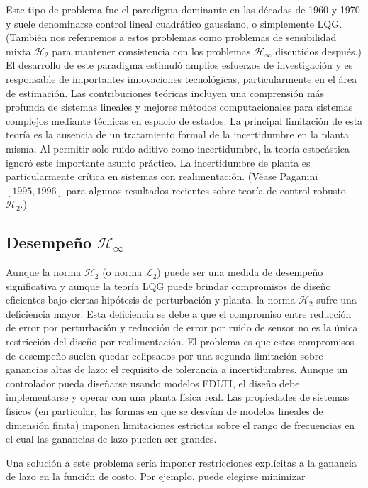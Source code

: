 Este tipo de problema fue el paradigma dominante en las décadas de 1960 y 1970 y suele denominarse control lineal cuadrático gaussiano, o simplemente LQG. (También nos referiremos a estos problemas como problemas de sensibilidad mixta $\mathcal{H}_{2}$ para mantener consistencia con los problemas $\mathcal{H}_{\infty}$ discutidos después.) El desarrollo de este paradigma estimuló amplios esfuerzos de investigación y es responsable de importantes innovaciones tecnológicas, particularmente en el área de estimación. Las contribuciones teóricas incluyen una comprensión más profunda de sistemas lineales y mejores métodos computacionales para sistemas complejos mediante técnicas en espacio de estados. La principal limitación de esta teoría es la ausencia de un tratamiento formal de la incertidumbre en la planta misma. Al permitir solo ruido aditivo como incertidumbre, la teoría estocástica ignoró este importante asunto práctico. La incertidumbre de planta es particularmente crítica en sistemas con realimentación. (Véase Paganini $[1995,1996]$ para algunos resultados recientes sobre teoría de control robusto $\mathcal{H}_{2}$.)

\subsection*{Desempeño $\mathcal{H}_{\infty}$}
Aunque la norma $\mathcal{H}_{2}$ (o norma $\mathcal{L}_{2}$) puede ser una medida de desempeño significativa y aunque la teoría LQG puede brindar compromisos de diseño eficientes bajo ciertas hipótesis de perturbación y planta, la norma $\mathcal{H}_{2}$ sufre una deficiencia mayor. Esta deficiencia se debe a que el compromiso entre reducción de error por perturbación y reducción de error por ruido de sensor no es la única restricción del diseño por realimentación. El problema es que estos compromisos de desempeño suelen quedar eclipsados por una segunda limitación sobre ganancias altas de lazo: el requisito de tolerancia a incertidumbres. Aunque un controlador pueda diseñarse usando modelos FDLTI, el diseño debe implementarse y operar con una planta física real. Las propiedades de sistemas físicos (en particular, las formas en que se desvían de modelos lineales de dimensión finita) imponen limitaciones estrictas sobre el rango de frecuencias en el cual las ganancias de lazo pueden ser grandes.

Una solución a este problema sería imponer restricciones explícitas a la ganancia de lazo en la función de costo. Por ejemplo, puede elegirse minimizar

